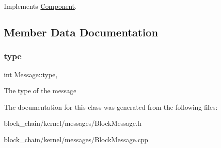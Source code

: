 Implements \mbox{\hyperlink{classComponent_a3e63d8c993e417a4af3f56d65ebfc7ea}{Component}}.



\subsection{Member Data Documentation}
\mbox{\label{classMessage_afbfb481c98b13d0deba0bac443bebe29}} 
\subsubsection{\texorpdfstring{type}{type}}
{\footnotesize\ttfamily int Message\+::type\hspace{0.3cm}{\ttfamily [protected]}, {\ttfamily [inherited]}}

The type of the message 

The documentation for this class was generated from the following files\+:\begin{DoxyCompactItemize}
\item 
block\+\_\+chain/kernel/messages/Block\+Message.\+h\item 
block\+\_\+chain/kernel/messages/Block\+Message.\+cpp\end{DoxyCompactItemize}
